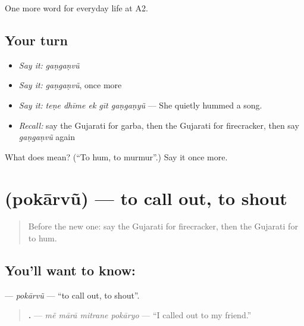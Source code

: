 \begin{grammarlens}[title={What you've built}]
One more word for everyday life at A2.
\end{grammarlens}

\subsection*{Your turn}
\begin{itemize}
\raggedright
  \item \emph{Say it:} \emph{gaṇgaṇvũ}
  \item \emph{Say it:} \emph{gaṇgaṇvũ}, once more
  \item \emph{Say it:} \emph{teṇe dhīme ek gīt gaṇgaṇyũ} — She quietly hummed a song.
  \item \emph{Recall:} say the Gujarati for garba, then the Gujarati for firecracker, then say \emph{gaṇgaṇvũ} again
\end{itemize}

\begin{tcolorbox}[breakable,colback=teal!4,colframe=teal!35!black,title={Before you move on}]
What does  mean? (\textquotedblleft{}To hum, to murmur\textquotedblright{}.) Say it once more.
\end{tcolorbox}
\section[\texorpdfstring{\gu{પોકારવું} (pokārvũ)}{પોકારવું (pokārvũ)}]{ (pokārvũ) — to call out, to shout}

\label{lesson:GU-C262-pokarvu}



\begin{quote}
Before the new one: say the Gujarati for firecracker, then the Gujarati for to hum.
\end{quote}

\subsection*{You'll want to know: }
\textbf{} — \emph{pokārvũ} — \textquotedblleft{}to call out, to shout\textquotedblright{}.

\begin{quote}
\textbf{   .} — \emph{mẽ mārā mitrane pokāryo} — \textquotedblleft{}I called out to my friend.\textquotedblright{}
\end{quote}

